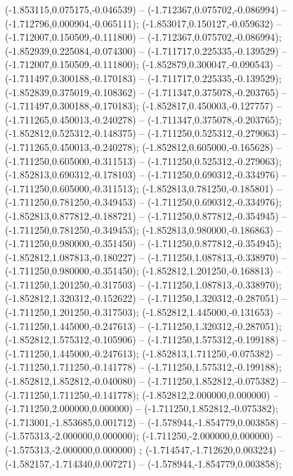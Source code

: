  (-1.853115,0.075175,-0.046539) -- (-1.712367,0.075702,-0.086994) -- (-1.712796,0.000904,-0.065111);
 (-1.853017,0.150127,-0.059632) -- (-1.712007,0.150509,-0.111800) -- (-1.712367,0.075702,-0.086994);
 (-1.852939,0.225084,-0.074300) -- (-1.711717,0.225335,-0.139529) -- (-1.712007,0.150509,-0.111800);
 (-1.852879,0.300047,-0.090543) -- (-1.711497,0.300188,-0.170183) -- (-1.711717,0.225335,-0.139529);
 (-1.852839,0.375019,-0.108362) -- (-1.711347,0.375078,-0.203765) -- (-1.711497,0.300188,-0.170183);
 (-1.852817,0.450003,-0.127757) -- (-1.711265,0.450013,-0.240278) -- (-1.711347,0.375078,-0.203765);
 (-1.852812,0.525312,-0.148375) -- (-1.711250,0.525312,-0.279063) -- (-1.711265,0.450013,-0.240278);
 (-1.852812,0.605000,-0.165628) -- (-1.711250,0.605000,-0.311513) -- (-1.711250,0.525312,-0.279063);
 (-1.852813,0.690312,-0.178103) -- (-1.711250,0.690312,-0.334976) -- (-1.711250,0.605000,-0.311513);
 (-1.852813,0.781250,-0.185801) -- (-1.711250,0.781250,-0.349453) -- (-1.711250,0.690312,-0.334976);
 (-1.852813,0.877812,-0.188721) -- (-1.711250,0.877812,-0.354945) -- (-1.711250,0.781250,-0.349453);
 (-1.852813,0.980000,-0.186863) -- (-1.711250,0.980000,-0.351450) -- (-1.711250,0.877812,-0.354945);
 (-1.852812,1.087813,-0.180227) -- (-1.711250,1.087813,-0.338970) -- (-1.711250,0.980000,-0.351450);
 (-1.852812,1.201250,-0.168813) -- (-1.711250,1.201250,-0.317503) -- (-1.711250,1.087813,-0.338970);
 (-1.852812,1.320312,-0.152622) -- (-1.711250,1.320312,-0.287051) -- (-1.711250,1.201250,-0.317503);
 (-1.852812,1.445000,-0.131653) -- (-1.711250,1.445000,-0.247613) -- (-1.711250,1.320312,-0.287051);
 (-1.852812,1.575312,-0.105906) -- (-1.711250,1.575312,-0.199188) -- (-1.711250,1.445000,-0.247613);
 (-1.852813,1.711250,-0.075382) -- (-1.711250,1.711250,-0.141778) -- (-1.711250,1.575312,-0.199188);
 (-1.852812,1.852812,-0.040080) -- (-1.711250,1.852812,-0.075382) -- (-1.711250,1.711250,-0.141778);
 (-1.852812,2.000000,0.000000) -- (-1.711250,2.000000,0.000000) -- (-1.711250,1.852812,-0.075382);
 (-1.713001,-1.853685,0.001712) -- (-1.578944,-1.854779,0.003858) -- (-1.575313,-2.000000,0.000000);
 (-1.711250,-2.000000,0.000000) -- (-1.575313,-2.000000,0.000000) ;
 (-1.714547,-1.712620,0.003224) -- (-1.582157,-1.714340,0.007271) -- (-1.578944,-1.854779,0.003858);
